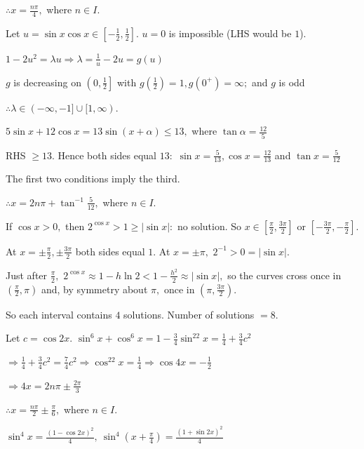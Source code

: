   $\therefore x = \frac{n\pi}{4},$ where $n\in I.$

\item Let $u = \sin x\cos x\in\left[-\frac{1}{2}, \frac{1}{2}\right].$ $u = 0$ is impossible (LHS would be $1$).

  $1 - 2u^2 = \lambda u \Rightarrow \lambda = \frac{1}{u} - 2u = g(u)$

  $g$ is decreasing on $\left(0, \frac{1}{2}\right]$ with $g\left(\frac{1}{2}\right) = 1, g(0^+) = \infty;$ and $g$ is odd

  $\therefore \lambda\in(-\infty, -1]\cup[1, \infty).$

\item $5\sin x + 12\cos x = 13\sin(x + \alpha)\leq 13,$ where $\tan\alpha = \frac{12}{5}$

  RHS $\geq 13.$ Hence both sides equal $13:$ $\sin x = \frac{5}{13}, \cos x = \frac{12}{13}$ and $\tan x = \frac{5}{12}$

  The first two conditions imply the third.

  $\therefore x = 2n\pi + \tan^{-1}\frac{5}{12},$ where $n\in I.$

\item If $\cos x > 0,$ then $2^{\cos x} > 1\geq|\sin x|:$ no solution. So $x\in\left[\frac{\pi}{2}, \frac{3\pi}{2}\right]$ or
  $\left[-\frac{3\pi}{2}, -\frac{\pi}{2}\right].$

  At $x = \pm\frac{\pi}{2}, \pm\frac{3\pi}{2}$ both sides equal $1.$ At $x = \pm\pi,$ $2^{-1} > 0 = |\sin x|.$

  Just after $\frac{\pi}{2},$ $2^{\cos x}\approx 1 - h\ln 2 < 1 - \frac{h^2}{2}\approx|\sin x|,$ so the curves cross once in
  $\left(\frac{\pi}{2}, \pi\right)$ and, by symmetry about $\pi,$ once in $\left(\pi, \frac{3\pi}{2}\right).$

  So each interval contains $4$ solutions. Number of solutions $= 8.$

\item Let $c = \cos2x.$ $\sin^6x + \cos^6x = 1 - \frac{3}{4}\sin^22x = \frac{1}{4} + \frac{3}{4}c^2$

  $\Rightarrow \frac{1}{4} + \frac{3}{4}c^2 = \frac{7}{4}c^2 \Rightarrow \cos^22x = \frac{1}{4} \Rightarrow \cos4x = -\frac{1}{2}$

  $\Rightarrow 4x = 2n\pi\pm\frac{2\pi}{3}$

  $\therefore x = \frac{n\pi}{2}\pm\frac{\pi}{6},$ where $n\in I.$

\item $\sin^4x = \frac{(1 - \cos2x)^2}{4},~\sin^4\left(x + \frac{\pi}{4}\right) = \frac{(1 + \sin2x)^2}{4}$

